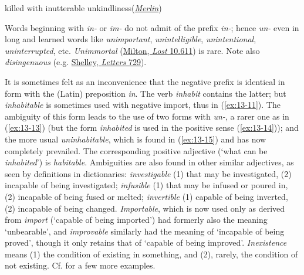 \ea \label{ex:13-10}
killed with inutterable unkindliness\hfill(\href{https://en.wikisource.org/wiki/Idylls_of_the_King/Merlin_and_Vivien}{\textit{Merlin}})
\z

Words beginning with \textit{in-} or \textit{im-} do not admit of the prefix \textit{in-}; hence \textit{un-} even in long and learned words like \textit{unimportant}, \textit{unintelligible}, \textit{unintentional}, \textit{uninterrupted}, etc. \textit{Unimmortal} (\href{https://archive.org/details/poeticalworksofj00miltiala/page/396/mode/2up?ref=ol&view=theater&q=unimmortal}{Milton, \textit{Lost} 10.611}) is rare. Note also \textit{disingenuous} (e.g. \href{https://archive.org/details/in.ernet.dli.2015.54181/page/n265/mode/2up?q=disingenuous&view=theater}{Shelley, \textit{Letters} 729}).

\bigskip
{}
It is sometimes felt as an inconvenience that the negative prefix is identical in form with the (Latin) preposition \textit{in}. The verb \textit{inhabit} contains the latter; but \textit{inhabitable} is sometimes used with negative import, thus in (\ref{ex:13-11}). The ambiguity of this form leads to the use of two forms with \textit{un-}, a rarer one as in (\ref{ex:13-13}) (but the form \textit{inhabited} is used in the positive sense (\ref{ex:13-14})); and the more usual \textit{uninhabitable}, which is found in (\ref{ex:13-15}) and has now completely prevailed. The corresponding positive adjective (`what can be \textit{inhabited}') is \textit{habitable}. Ambiguities are also found in other similar adjectives, as seen by definitions in dictionaries: \textit{investigable} (1) that may be investigated, (2) incapable of being investigated; \textit{infusible} (1) that may be infused or poured in, (2) incapable of being fused or melted; \textit{invertible} (1) capable of being inverted, (2) incapable of being changed. \textit{Importable}, which is now used only as derived from \textit{import} (`capable of being imported') had formerly also the meaning `unbearable', and \textit{improvable} similarly had the meaning of `incapable of being proved', though it only retains that of `capable of being improved'. \textit{Inexistence} means (1) the condition of existing in something, and (2), rarely, the condition of not existing. Cf. \citet[\S140]{jespersen1905growth} %
for a few more examples.

